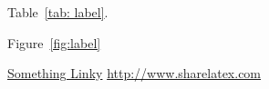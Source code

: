 Table~\ref{tab: label}.

Figure~\ref{fig:label} 

\cite{citation key}

\href{http://www.sharelatex.com}{Something Linky}
\url{http://www.sharelatex.com}
